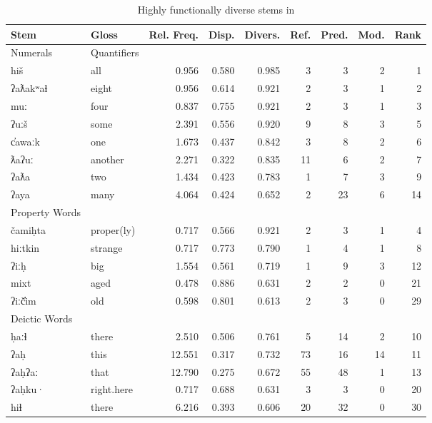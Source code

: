 \begin{table}
  \centering
  \caption{Highly functionally diverse stems in }
  \label{tab:Nuuchahnulth-high-functional-diversity}
  \begin{tabular}{ l l r r r r r r r }
    \toprule
    Stem & Gloss & Rel. Freq. & Disp. & Divers. & Ref. & Pred. & Mod. & Rank\\

    \midrule
    Numerals & Quantifiers\\
    \midrule
    hiš      & all        & 0.956 & 0.580 & 0.985 &  3 &  3 & 2 &  1\\
    ʔaƛakʷaɬ & eight      & 0.956 & 0.614 & 0.921 &  2 &  3 & 1 &  2\\
    muː      & four       & 0.837 & 0.755 & 0.921 &  2 &  3 & 1 &  3\\
    ʔuːš     & some       & 2.391 & 0.556 & 0.920 &  9 &  8 & 3 &  5\\
    c̓awaːk   & one        & 1.673 & 0.437 & 0.842 &  3 &  8 & 2 &  6\\
    ƛaʔuː    & another    & 2.271 & 0.322 & 0.835 & 11 &  6 & 2 &  7\\
    ʔaƛa     & two        & 1.434 & 0.423 & 0.783 &  1 &  7 & 3 &  9\\
    ʔaya     & many       & 4.064 & 0.424 & 0.652 &  2 & 23 & 6 & 14\\

    \midrule
    Property Words\\
    \midrule
    čamiḥta  & proper(ly) & 0.717 & 0.566 & 0.921 &  2 &  3 & 1 &  4\\
    hiːtkin  & strange    & 0.717 & 0.773 & 0.790 &  1 &  4 & 1 &  8\\
    ʔiːḥ     & big        & 1.554 & 0.561 & 0.719 &  1 &  9 & 3 & 12\\
    mixt     & aged       & 0.478 & 0.886 & 0.631 &  2 &  2 & 0 & 21\\
    ʔiːč̓im   & old        & 0.598 & 0.801 & 0.613 &  2 &  3 & 0 & 29\\

    \midrule
    Deictic Words\\
    \midrule
    ḥaːɬ   & there      &  2.510 & 0.506 & 0.761 &  5 & 14 &  2 & 10\\
    ʔaḥ    & this       & 12.551 & 0.317 & 0.732 & 73 & 16 & 14 & 11\\
    ʔaḥʔaː & that       & 12.790 & 0.275 & 0.672 & 55 & 48 &  1 & 13\\
    ʔaḥku· & right.here &  0.717 & 0.688 & 0.631 &  3 &  3 &  0 & 20\\
    hiɬ    & there      &  6.216 & 0.393 & 0.606 & 20 & 32 &  0 & 30\\

    \bottomrule
  \end{tabular}
\end{table}

